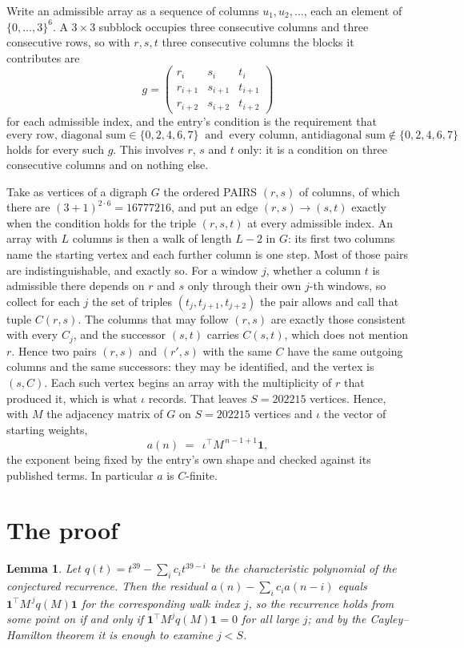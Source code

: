 \documentclass[11pt,a4paper]{article}
\theoremstyle{plain}
\newtheorem{lemma}[theorem]{Lemma}
\theoremstyle{definition}
\begin{document}
Write an admissible array as a sequence of columns $u_1,u_2,\dots$, each an element of
$\{0,\dots,3\}^{6}$. A $3\times3$ subblock occupies three consecutive columns and
three consecutive rows, so with $r,s,t$ three consecutive columns the blocks it
contributes are
\[
g=\begin{pmatrix}r_i&s_i&t_i\\ r_{i+1}&s_{i+1}&t_{i+1}\\ r_{i+2}&s_{i+2}&t_{i+2}\end{pmatrix}
\]
for each admissible index, and the entry's condition is the requirement that
\[
\text{every row, diagonal sum} \in \{0,2,4,6,7\}\ \text{ and }\ \text{every column, antidiagonal sum} \notin \{0,2,4,6,7\}
\]
holds for every such $g$. This involves $r$, $s$ and $t$ only: it is a condition on
three consecutive columns and on nothing else.

Take as vertices of a digraph $G$ the ordered PAIRS $(r,s)$ of columns, of which there are
$(3+1)^{2\cdot6}=16777216$, and put an edge $(r,s)\to(s,t)$ exactly when the condition
holds for the triple $(r,s,t)$ at every admissible index. An array with $L$ columns is then a
walk of length $L-2$ in $G$: its first two columns name the starting vertex and each further
column is one step. Most of those pairs are indistinguishable, and exactly so. For a window $j$, whether a column $t$ is admissible there depends on $r$ and $s$ only through their own $j$-th windows, so collect for each $j$ the set of triples $(t_j,t_{j+1},t_{j+2})$ the pair allows and call that tuple $C(r,s)$. The columns that may follow $(r,s)$ are exactly those consistent with every $C_j$, and the successor $(s,t)$ carries $C(s,t)$, which does not mention $r$. Hence two pairs $(r,s)$ and $(r',s)$ with the same $C$ have the same outgoing columns and the same successors: they may be identified, and the vertex is $(s,C)$. Each such vertex begins an array with the multiplicity of $r$ that produced it, which is what $\iota$ records. That leaves $S=202215$ vertices. Hence, with $M$ the adjacency matrix of $G$ on $S=202215$ vertices and
$\iota$ the vector of starting weights,
\[
a(n)\;=\;\,\iota^{\!\top}M^{\,n-1+1}\mathbf{1},
\]
the exponent being fixed by the entry's own shape and checked against its published terms.
In particular $a$ is $C$-finite.

\section{The proof}

\begin{lemma}\label{lem:crit}
Let $q(t)=t^{39}-\sum_i c_it^{39-i}$ be the characteristic polynomial of the
conjectured recurrence. Then the residual $a(n)-\sum_ic_ia(n-i)$ equals
$\mathbf{1}^{\!\top}M^{\,j}q(M)\mathbf{1}$ for the corresponding walk index
$j$, so the recurrence holds from some point on if and only if
$\mathbf{1}^{\!\top}M^{j}q(M)\mathbf{1}=0$ for all large $j$; and by the
Cayley--Hamilton theorem it is enough to examine $j<S$.
\end{lemma}
\end{document}
